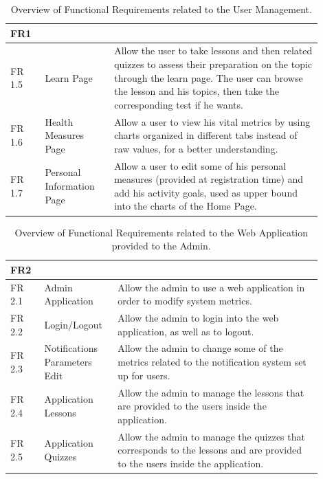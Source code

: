 \begin{table}[h!]
    \setstretch{\myspacing}
    \centering
    \begin{tabular}{|>{\raggedright\arraybackslash}p{0.1\linewidth}|>{\raggedright\arraybackslash}p{0.2\linewidth}|>{\raggedright\arraybackslash}p{0.6\linewidth}|}
        \hline
        \textbf{FR1} & \multicolumn{2}{>{\centering\arraybackslash}p{0.7\linewidth}|}{\textbf{User Management}} \\
        \hline
        FR 1.5 & Learn Page & Allow the user to take lessons and then related quizzes to assess their preparation on the topic through the learn page. The user can browse the lesson and his topics, then take the corresponding test if he wants. \\
        \hline
        FR 1.6 & Health Measures Page & Allow a user to view his vital metrics by using charts organized in different tabs instead of raw values, for a better understanding. \\
        \hline
        FR 1.7 & Personal Information Page & Allow a user to edit some of his personal measures (provided at registration time) and add his activity goals, used as upper bound into the charts of the Home Page. \\
        \hline
    \end{tabular}
    \caption{Overview of Functional Requirements related to the User Management.}
\end{table}

\begin{table}[h!]
    \setstretch{\myspacing}
    \centering
    \begin{tabular}{|>{\raggedright\arraybackslash}p{0.1\linewidth}|>{\raggedright\arraybackslash}p{0.2\linewidth}|>{\raggedright\arraybackslash}p{0.6\linewidth}|}
        \hline
        \textbf{FR2} & \multicolumn{2}{>{\centering\arraybackslash}p{0.7\linewidth}|}{\textbf{Admin Management}} \\
        \hline
        FR 2.1 & Admin Application & Allow the admin to use a web application in order to modify system metrics. \\
        \hline
        FR 2.2 & Login/Logout & Allow the admin to login into the web application, as well as to logout. \\
        \hline
        FR 2.3 & Notifications Parameters Edit & Allow the admin to change some of the metrics related to the notification system set up for users. \\
        \hline
        FR 2.4 & Application Lessons & Allow the admin to manage the lessons that are provided to the users inside the application. \\
        \hline
        FR 2.5 & Application Quizzes & Allow the admin to manage the quizzes that corresponds to the lessons and are provided to the users inside the application. \\
        \hline
    \end{tabular}
    \caption{Overview of Functional Requirements related to the Web Application provided to the Admin.}
    \label{tab:fr2}
\end{table}

